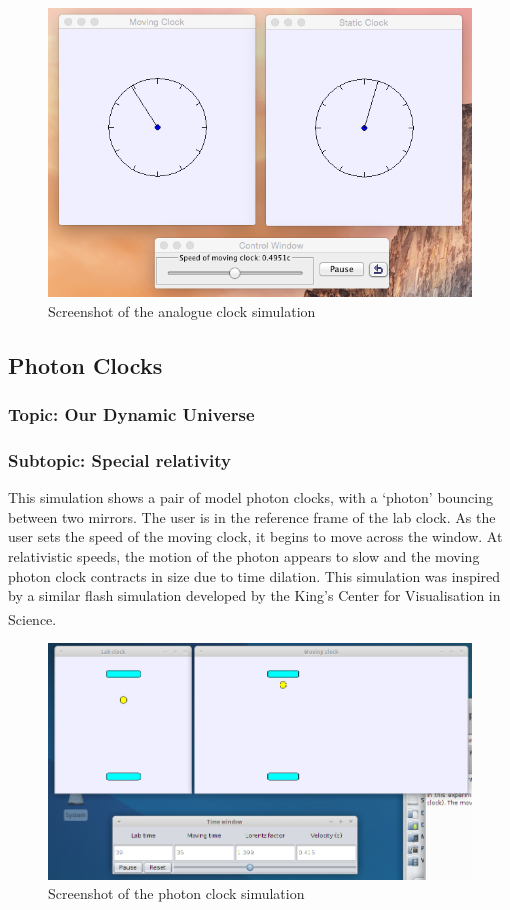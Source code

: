 \documentclass[11pt]{article}
\begin{document}
\begin{figure}[H]
\centering
\includegraphics[scale=0.4]{./analogueUI.png}
\caption{Screenshot of the analogue clock simulation}
\end{figure}

\subsection*{Photon Clocks}
\subsubsection*{Topic: Our Dynamic Universe}
\subsubsection*{Subtopic: Special relativity}
 This simulation shows a pair of model photon clocks, with a `photon'
 bouncing between two mirrors. The user is in the reference frame of
 the lab clock. As the user sets the speed of the moving clock, it
 begins to move across the window. At relativistic speeds, the motion
 of the photon appears to slow and the moving photon clock contracts
 in size due to time dilation. This simulation was inspired by a
 similar flash simulation developed by the King's Center for
 Visualisation in Science\textsuperscript{\cite{rocket}}.
\begin{figure}[H]
\centering
\includegraphics[width=.9\linewidth]{./mirrorUI.png}
\caption{Screenshot of the photon clock simulation}
\end{figure}
\end{document}
